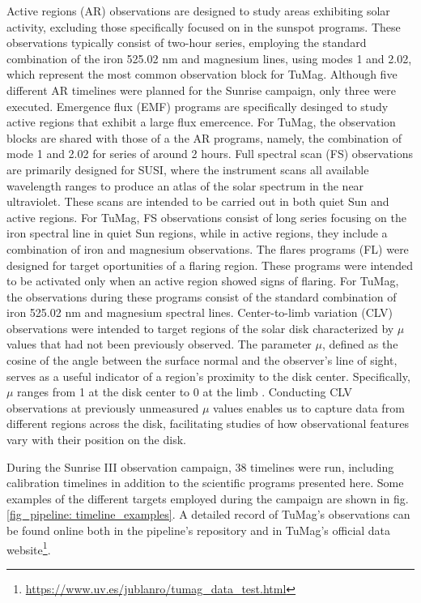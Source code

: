 \begin{itemize}
  \Myitem Active regions (AR) observations are designed to study areas exhibiting solar activity, excluding those specifically focused on in the sunspot programs. These observations typically consist of two-hour series, employing the standard combination of the iron 525.02 nm and magnesium lines, using modes 1 and 2.02, which represent the most common observation block for TuMag. Although five different AR timelines were planned for the Sunrise campaign, only three were executed.
  \Myitem Emergence flux (EMF) programs are specifically desinged to study active regions that exhibit a large flux emercence. For TuMag, the observation blocks are shared with those of a the AR programs, namely, the combination of mode 1 and 2.02 for series of around 2 hours. 
  \Myitem Full spectral scan (FS) observations are primarily designed for SUSI, where the instrument scans all available wavelength ranges to produce an atlas of the solar spectrum in the near ultraviolet. These scans are intended to be carried out in both quiet Sun and active regions. For TuMag, FS observations consist of long series focusing on the iron spectral line in quiet Sun regions, while in active regions, they include a combination of iron and magnesium observations.
  \Myitem The flares programs (FL) were designed for target oportunities of a flaring region. These programs were intended to be activated only when an active region showed signs of flaring. For TuMag, the observations during these programs consist of the standard combination of iron 525.02 nm and magnesium spectral lines.
  \Myitem Center-to-limb variation (CLV) observations were intended to target regions of the solar disk characterized by $\mu$ values that had not been previously observed. The parameter $\mu$, defined as the cosine of the angle between the surface normal and the observer's line of sight, serves as a useful indicator of a region's proximity to the disk center. Specifically, $\mu$ ranges from 1 at the disk center to 0 at the limb \citep{thompson2006coordinate}. Conducting CLV observations at previously unmeasured $\mu$ values enables us to capture data from different regions across the disk, facilitating studies of how observational features vary with their position on the disk. 
\end{itemize}

During the Sunrise III observation campaign, 38 timelines were run, including calibration timelines in addition to the scientific programs presented here. Some examples of the different targets employed during the campaign are shown in fig. \ref{fig_pipeline: timeline_examples}.  A detailed record of TuMag's observations can be found online both in the pipeline's repository and in TuMag's official data website\footnote{\url{https://www.uv.es/jublanro/tumag_data_test.html}}.  

